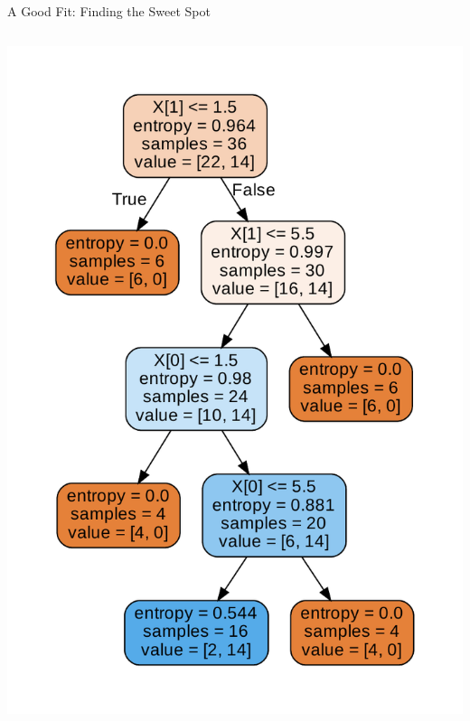 \documentclass[aspectratio=169,10pt]{beamer}
\newcommand{\fitpic}[1]{\begin{adjustbox}{max width=\linewidth, max totalheight=0.78\textheight}#1\end{adjustbox}}
\begin{document}
\begin{frame}{A Good Fit: Finding the Sweet Spot}
\begin{columns}
\begin{column}{0.5\textwidth}
			\fitpic{\includegraphics[width =\textwidth]{example-2-optimal-tree}}
		\end{column}
	\end{columns}

	\end{frame}
\end{document}
